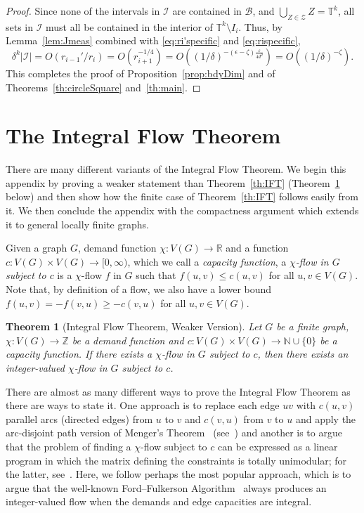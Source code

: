 \documentclass[12pt,a4paper]{amsart}
\numberwithin{equation}{section}
\newtheorem{theorem}[equation]{Theorem}
\theoremstyle{definition}
\begin{document}
\begin{proof}
Since none of the intervals in $\mathcal{I}$ are contained in $\mathcal{B}$, and $\bigcup_{Z\in\mathcal{Z}}Z = \mathbb{T}^k$, all sets in $\mathcal{I}$ must all be contained in the interior of $\mathbb{T}^k\setminus I_i$. Thus, by Lemma~\ref{lem:Jmeas} combined with \eqref{eq:ri'specific} and \eqref{eq:rispecific},
\[\delta^k|\mathcal{I}| = O(r_{i-1}'/r_i)=O\left(r_{i+1}^{-1/4}\right) = O\left((1/\delta)^{-(\epsilon-\zeta)\frac{\varepsilon}{4d^2}}\right)=O\left((1/\delta)^{-\zeta}\right).\]
This completes the proof of Proposition~\ref{prop:bdyDim} and of Theorems~\ref{th:circleSquare} and~\ref{th:main}.
\end{proof}

\DeclareRobustCommand{\VON}[3]{#3}


\appendix

\section{The Integral Flow Theorem}
\label{app:IFT}

There are many different variants of the Integral Flow Theorem. We begin this appendix by proving a weaker statement than Theorem~\ref{th:IFT} (Theorem~\ref{th:IFT2} below) and then show how the finite case of Theorem~\ref{th:IFT} follows easily from it. We then conclude the appendix with the compactness argument which extends it to general locally finite graphs. 

Given a graph $G$, demand function $\chi:V(G)\to \mathbb{R}$ and a function $c:V(G)\times V(G)\to [0,\infty)$, which we call a \emph{capacity function}, a \emph{$\chi$-flow in $G$ subject to $c$} is a $\chi$-flow $f$ in $G$ such that $f(u,v)\leq c(u,v)$ for all $u,v\in V(G)$. Note that, by definition of a flow, we also have a lower bound $f(u,v)=-f(v,u)\geq -c(v,u)$ for all $u,v\in V(G)$.

\begin{theorem}[Integral Flow Theorem, Weaker Version]
\label{th:IFT2}
Let $G$ be a finite graph, $\chi:V(G)\to \mathbb{Z}$ be a demand function and $c:V(G)\times V(G)\to \mathbb{N}\cup\{0\}$ be a capacity function. If there exists a $\chi$-flow in $G$ subject to $c$, then there exists an integer-valued $\chi$-flow in $G$ subject to $c$.
\end{theorem}

There are almost as many different ways to prove the Integral Flow Theorem as there are ways to state it. One approach is to replace each edge $uv$ with $c(u,v)$ parallel arcs (directed edges) from $u$ to $v$ and $c(v,u)$ from $v$ to $u$ and apply the arc-disjoint path version of Menger's Theorem~\cite{Menger27} (see~\cite[Corollary~9.1b]{Schrijver03}) and another is to argue that the problem of finding a $\chi$-flow subject to $c$ can be expressed as a linear program in which the matrix defining the constraints is totally unimodular; for the latter, see~\cite[Corollary~13.9a]{Schrijver03}. Here, we follow perhaps the most popular approach, which is to argue that the well-known Ford--Fulkerson Algorithm~\cite{FordFulkerson57} always produces an integer-valued flow when the demands and edge capacities are integral.
\end{document}
